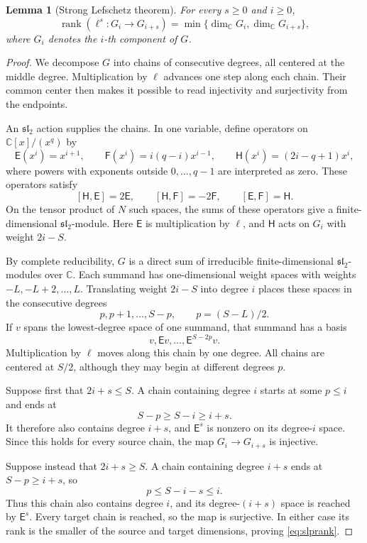 \documentclass[12pt,reqno]{amsart}
\newcommand{\C}{\mathbb C}
\newcommand{\rank}{\operatorname{rank}}
\newtheorem{lemma}[theorem]{Lemma}
\theoremstyle{definition}
\begin{document}
\begin{lemma}[Strong Lefschetz theorem]\label{lem:slp}
 For every $s\geq0$ and $i\geq0$,
\begin{equation}\label{eq:slprank}
 \rank(\ell^s:G_i\longrightarrow G_{i+s})
          =\min\{\dim_\C G_i,\dim_\C G_{i+s}\},
\end{equation}
where $ G_i $ denotes the $i$-th component of $G$. 
\end{lemma}
\begin{proof}
We decompose $G$ into chains of consecutive degrees, all centered
at the middle degree. Multiplication by $\ell$ advances one step
along each chain. Their common center then makes it possible to
read injectivity and surjectivity from the endpoints.

An $\mathfrak{sl}_2$ action supplies the chains. In one variable,
define operators on $\C[x]/(x^q)$ by
\[
 \mathsf E(x^i)=x^{i+1},\qquad
 \mathsf F(x^i)=i(q-i)x^{i-1},\qquad
 \mathsf H(x^i)=(2i-q+1)x^i,
\]
where powers with exponents outside $0,\ldots,q-1$ are interpreted
as zero. These operators satisfy
\[
 [\mathsf H,\mathsf E]=2\mathsf E,\qquad
 [\mathsf H,\mathsf F]=-2\mathsf F,\qquad
 [\mathsf E,\mathsf F]=\mathsf H.
\]
On the tensor product of $N$ such spaces, the sums of these
operators give a finite-dimensional $\mathfrak{sl}_2$-module.
Here $\mathsf E$ is multiplication by $\ell$, and $\mathsf H$ acts on $G_i$
with weight $2i-S$.

By complete reducibility, $G$ is a direct sum of irreducible
finite-dimensional $\mathfrak{sl}_2$-modules over $\C$.
Each summand has one-dimensional weight spaces with weights
$-L,-L+2,\ldots,L$. Translating weight $2i-S$ into
degree $i$ places these spaces in the consecutive degrees
\[
 p,p+1,\ldots,S-p,\qquad p=(S-L)/2.
\]
If $v$ spans the lowest-degree space of one summand, that summand
has a basis
\[
 v,\mathsf Ev,\ldots,\mathsf E^{S-2p}v.
\]
Multiplication by $\ell$ moves along this chain by one degree.
All chains are centered at $S/2$, although they may begin at
different degrees $p$.

Suppose first that $2i+s\leq S$. A chain containing degree $i$
starts at some $p\leq i$ and ends at
\[
 S-p\geq S-i\geq i+s.
\]
It therefore also contains degree $i+s$, and $\mathsf E^s$ is
nonzero on its degree-$i$ space. Since this holds for every source
chain, the map $G_i\to G_{i+s}$ is injective.

Suppose instead that $2i+s\geq S$. A chain containing degree
$i+s$ ends at $S-p\geq i+s$, so
\[
 p\leq S-i-s\leq i.
\]
Thus this chain also contains degree $i$, and its degree-$(i+s)$
space is reached by $\mathsf E^s$. Every target chain is reached,
so the map is surjective. In either case its rank is the smaller
of the source and target dimensions, proving \eqref{eq:slprank}.
\end{proof}
\end{document}
